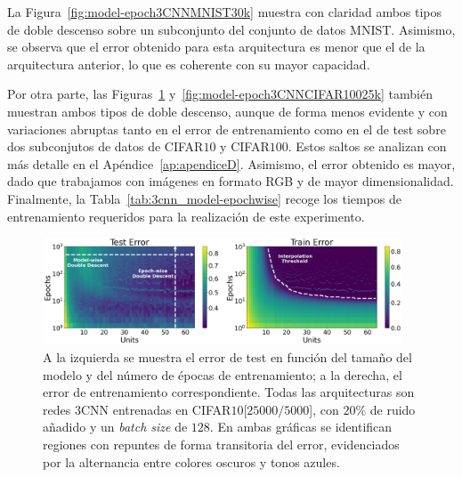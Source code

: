 La Figura~\ref{fig:model-epoch3CNNMNIST30k} muestra con claridad ambos tipos de doble descenso sobre un subconjunto del conjunto de datos MNIST. Asimismo, se observa que el error obtenido para esta arquitectura es menor que el de la arquitectura anterior, lo que es coherente con su mayor capacidad.

Por otra parte, las Figuras~\ref{fig:model-epoch3CNNCIFAR10} y~\ref{fig:model-epoch3CNNCIFAR10025k} también muestran ambos tipos de doble descenso, aunque de forma menos evidente y con variaciones abruptas tanto en el error de entrenamiento como en el de test sobre dos subconjutos de datos de CIFAR$10$ y CIFAR$100$. Estos saltos se analizan con más detalle en el Apéndice~\ref{ap:apendiceD}. Asimismo, el error obtenido es mayor, dado que trabajamos con imágenes en formato RGB y de mayor dimensionalidad. Finalmente, la Tabla~\ref{tab:3cnn_model-epochwise} recoge los tiempos de entrenamiento requeridos para la realización de este experimento.

\begin{figure}[h]
    \centering
    \includegraphics[width=0.95\textwidth]{img/experiments/model-epoch3CNNCIFAR1025k.png}
    \caption[Doble descenso en función del tamaño del modelo y del número de épocas para la red $3$CNN y un subconjunto de CIFAR$10$.]{A la izquierda se muestra el error de test en función del tamaño del modelo y del número de épocas de entrenamiento; a la derecha, el error de entrenamiento correspondiente. Todas las arquitecturas son redes $3$CNN entrenadas en CIFAR$10$[$25000/5000$], con $20\%$ de ruido añadido y un \textit{batch size} de $128$. En ambas gráficas se identifican regiones con repuntes de forma transitoria del error, evidenciados por la alternancia entre colores oscuros y tonos azules.}\label{fig:model-epoch3CNNCIFAR10}
\end{figure}

